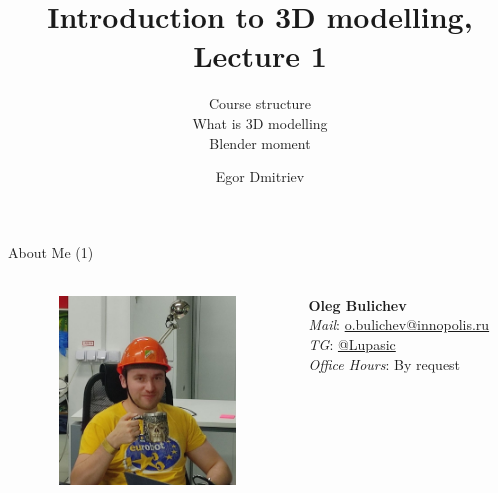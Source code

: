 \documentclass[aspectratio=169,notes]{beamer}
\title[I3D]{Introduction to 3D modelling, Lecture 1} %
\subtitle{Course structure \\ What is 3D modelling \\ Blender moment
         } %
\author{Egor Dmitriev}
\newcommand{\fbckg}[1]{\usebackgroundtemplate{\texttt{[image: \#1]}}}%
\begin{document}
\setlength{\abovedisplayskip}{0pt}
\setlength{\belowdisplayskip}{0pt}
\setlength{\abovedisplayshortskip}{0pt}
\setlength{\belowdisplayshortskip}{0pt}

\fbckg{fibeamer/figs/title_page.png}

\fbckg{fibeamer/figs/common.png}

\begin{frame}[t]{About Me (1)}
    \framesubtitle{}
    \begin{columns}[T,onlytextwidth]
        \begin{column}{0.49\textwidth}
            \begin{figure}[H]
                \centering\includegraphics[height=5cm,width=1\textwidth,keepaspectratio]{Oleg.jpg}
                \label{fig:Oleg.jpg}
            \end{figure}
        \end{column}
        \begin{column}{0.49\textwidth}
            \Large
            \vspace{2cm}
            \centering
            \textbf{Oleg Bulichev} \\
            \textit{Mail}: \url{o.bulichev@innopolis.ru}\\
            \textit{TG}: \url{@Lupasic} \\
            \textit{Office Hours}: By request
        \end{column}
    \end{columns}
\end{frame}
\end{document}
